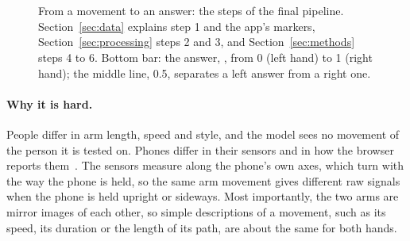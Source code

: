 \begin{figure}[tbp]
\centering
\begin{minipage}[c]{0.34\linewidth}\centering
  \\[4pt]
  \\[4pt]
\end{minipage}\hfill
\begin{minipage}[c]{0.58\linewidth}\centering
  
\end{minipage}\par\medskip
\captionsetup{format=plain,justification=raggedright,singlelinecheck=false}
\begin{minipage}[t]{0.34\linewidth}
  \caption{The movement as the app's instructions draw it (right hand, phone upright, natural speed): arm extended
    and still (top), on the way (middle), touch and hold (bottom); left of each frame the person seen from the
    side, right of it the phone as the person sees it. (The arm's colour is the app's; in our figures red marks
    the left hand and blue the right.)}
  \label{fig:gesture}
\end{minipage}\hfill
\begin{minipage}[t]{0.58\linewidth}
  \caption{From a movement to an answer: the steps of the final pipeline. Section~\ref{sec:data} explains step 1
    and the app's markers, Section~\ref{sec:processing} steps 2 and 3, and Section~\ref{sec:methods} steps 4
    to 6. Bottom bar: the answer, \pright{}, from 0 (left hand) to 1 (right hand); the middle line, 0.5,
    separates a left answer from a right one.}
  \label{fig:overview}
\end{minipage}
\end{figure}

\paragraph{Why it is hard.} People differ in arm length, speed and style, and the model sees no movement of the
person it is tested on. Phones differ in their sensors and in how the browser reports
them~\cite{stisen2015heterogeneity}. The sensors measure along the phone's own axes, which turn with the way the
phone is held, so the same arm movement gives different raw signals when the phone is held upright or sideways. Most
importantly, the two arms are mirror images of each other, so simple descriptions of a movement, such as its speed,
its duration or the length of its path, are about the same for both hands.

